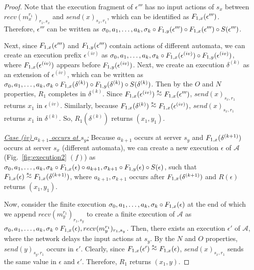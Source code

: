 \begin{proof}
             Note that the execution fragment of $\epsilon'''$ has no input actions of $s_x$ between $ recv(m_x^{r_1})_{r_1, s_x}$ and $send(x)_{s_x, r_1}$, which can be identified as $\frag{1,x}{\epsilon'''}$. Therefore, $\epsilon'''$ can be written as      $\finiteprefix{k-1}{k }  \circ \frag{1,y}{\epsilon'''} \circ \frag{1,x}{\epsilon'''} \circ \suffix{\epsilon'''}$.
   
    Next, since $\frag{1,x}{\epsilon'''}$ and $\frag{1,y}{\epsilon'''}$ contain actions of different automata, 
    we can create an execution prefix  $\epsilon^{(iv)}$ as 
    $\finiteprefix{k-1}{k }  \circ \frag{1,x}{\epsilon^{(iv)}} \circ \frag{1,y}{\epsilon^{(iv)}}$, 
     where  
     $\frag{1,x}{\epsilon^{(iv)}}$ appears before $\frag{1,y}{\epsilon^{(iv)}}$. Next, 
     we create an execution $\delta^{(k)}$ as an extension of 
       $\epsilon^{(iv)}$, which can be written   as $\finiteprefix{k-1}{k } \circ \frag{1,x}{\delta^{(k)}} \circ \frag{1,y}{\delta^{(k)}}\circ \suffix{\delta^{(k)}}$. 
       Then by the $O$ and $N$ properties, $R_1$ completes in $\delta^{(k)}$.  
       Since $\frag{1,x}{\epsilon^{(iv)}} \stackrel{s_x}{\sim} \frag{1,x}{\epsilon'''}$, $send(x)_{s_x, r_1}$ returns $x_1$ in $\epsilon^{(iv)}$. 
    Similarly, because 
      $\frag{1,x}{\delta^{(k)}} \stackrel{s_x}{\sim} \frag{1,x}{\epsilon^{(iv)}}$, $send(x)_{s_x, r_1}$ returns $x_1$ in $\delta^{(k)}$. So,
     $R_1(\delta^{(k)})$ returns $(x_1, y_1)$.

\emph{ \underline{Case (iv) $a_{k+1}$ occurs at $s_y$:}} Because $a_{k+1}$ occurs at server $s_y$ and $\frag{1,x}{\delta^{(k+1)}}$ occurs at server $s_x$ (different automata),  
we can create a new execution $\epsilon$ of $\mathcal{A}$ (Fig.~\ref{fig:execution2} $(f)$)  as   
             $\finiteprefix{k-1}{k } \circ \frag{1,x}{\epsilon} \circ a_{k+1}, \sigma_{k+1} \circ 
        \frag{1,y}{\epsilon}\circ \suffix{\epsilon}$, such that $\frag{1,x}{\epsilon} \stackrel{s_x}{\sim}\frag{1,x}{\delta^{(k+1)}}$, where  
         $a_{k+1}, \sigma_{k+1} $
       occurs after $\frag{1,x}{\delta^{(k+1)}}$ and 
         $R(\epsilon)$ returns $(x_1, y_1)$.
        
     Now, consider the finite execution   $\finiteprefix{k-1}{k }\circ \frag{1,x}{\epsilon}$ at the end of which we append $recv(m_y^{r_1})_{r_1, s_y}$ to create a finite execution of $\mathcal{A}$ as 
        $\finiteprefix{k-1}{k }\circ \frag{1,x}{\epsilon}, recv(m_y^{r_1})_{r_1, s_y}$. 
        Then, there exists 
        an execution $\epsilon'$ of $\mathcal{A}$, where 
              the network delays the input actions at $s_y$. By the $N$ and $O$ properties, $send(y)_{s_y, r_1}$ occurs in $\epsilon'$. Clearly, since   $\frag{1,x}{\epsilon'} \stackrel{s_x}{\sim} \frag{1,x}{\epsilon}$, $send(x)_{s_x, r_1}$ sends the same value in $\epsilon$ and $\epsilon'$. Therefore,  $R_1$ returns $(x_1, y)$.
              

\end{proof}
